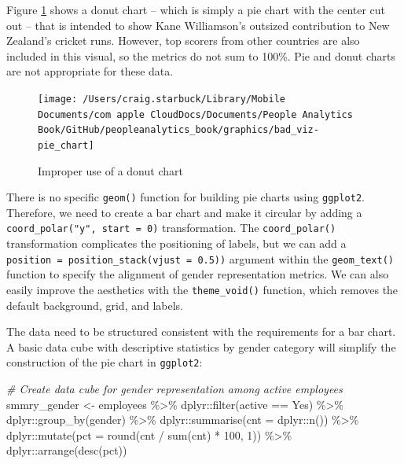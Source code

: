 \documentclass[
]{book}
\newenvironment{Shaded}{\begin{snugshade}}{\end{snugshade}}
\newcommand{\AttributeTok}[1]{\textcolor[rgb]{0.77,0.63,0.00}{#1}}
\newcommand{\CommentTok}[1]{\textcolor[rgb]{0.56,0.35,0.01}{\textit{#1}}}
\newcommand{\DecValTok}[1]{\textcolor[rgb]{0.00,0.00,0.81}{#1}}
\newcommand{\FunctionTok}[1]{\textcolor[rgb]{0.00,0.00,0.00}{#1}}
\newcommand{\NormalTok}[1]{#1}
\newcommand{\OtherTok}[1]{\textcolor[rgb]{0.56,0.35,0.01}{#1}}
\newcommand{\SpecialCharTok}[1]{\textcolor[rgb]{0.00,0.00,0.00}{#1}}
\newcommand{\StringTok}[1]{\textcolor[rgb]{0.31,0.60,0.02}{#1}}
\begin{document}
Figure \ref{fig:bad-donut-chart} shows a donut chart -- which is simply a pie chart with the center cut out -- that is intended to show Kane Williamson's outsized contribution to New Zealand's cricket runs. However, top scorers from other countries are also included in this visual, so the metrics do not sum to 100\%. Pie and donut charts are not appropriate for these data.

\begin{figure}

{\centering \texttt{[image: /Users/craig.starbuck/Library/Mobile Documents/com~apple~CloudDocs/Documents/People Analytics Book/GitHub/peopleanalytics\_book/graphics/bad\_viz-pie\_chart]} 

}

\caption{Improper use of a donut chart}\label{fig:bad-donut-chart}
\end{figure}

There is no specific \texttt{geom()} function for building pie charts using \texttt{ggplot2}. Therefore, we need to create a bar chart and make it circular by adding a \texttt{coord\_polar("y",\ start\ =\ 0)} transformation. The \texttt{coord\_polar()} transformation complicates the positioning of labels, but we can add a \texttt{position\ =\ position\_stack(vjust\ =\ 0.5))} argument within the \texttt{geom\_text()} function to specify the alignment of gender representation metrics. We can also easily improve the aesthetics with the \texttt{theme\_void()} function, which removes the default background, grid, and labels.

The data need to be structured consistent with the requirements for a bar chart. A basic data cube with descriptive statistics by gender category will simplify the construction of the pie chart in \texttt{ggplot2}:

\begin{Shaded}
\begin{Highlighting}[]
\CommentTok{\# Create data cube for gender representation among active employees}
\NormalTok{smmry\_gender }\OtherTok{\textless{}{-}}\NormalTok{ employees }\SpecialCharTok{\%\textgreater{}\%}
\NormalTok{                dplyr}\SpecialCharTok{::}\FunctionTok{filter}\NormalTok{(active }\SpecialCharTok{==} \StringTok{\textquotesingle{}Yes\textquotesingle{}}\NormalTok{) }\SpecialCharTok{\%\textgreater{}\%}
\NormalTok{                dplyr}\SpecialCharTok{::}\FunctionTok{group\_by}\NormalTok{(gender) }\SpecialCharTok{\%\textgreater{}\%}
\NormalTok{                dplyr}\SpecialCharTok{::}\FunctionTok{summarise}\NormalTok{(}\AttributeTok{cnt =}\NormalTok{ dplyr}\SpecialCharTok{::}\FunctionTok{n}\NormalTok{()) }\SpecialCharTok{\%\textgreater{}\%}
\NormalTok{                dplyr}\SpecialCharTok{::}\FunctionTok{mutate}\NormalTok{(}\AttributeTok{pct =} \FunctionTok{round}\NormalTok{(cnt }\SpecialCharTok{/} \FunctionTok{sum}\NormalTok{(cnt) }\SpecialCharTok{*} \DecValTok{100}\NormalTok{, }\DecValTok{1}\NormalTok{)) }\SpecialCharTok{\%\textgreater{}\%}
\NormalTok{                dplyr}\SpecialCharTok{::}\FunctionTok{arrange}\NormalTok{(}\FunctionTok{desc}\NormalTok{(pct))}
\end{Highlighting}
\end{Shaded}
\end{document}
